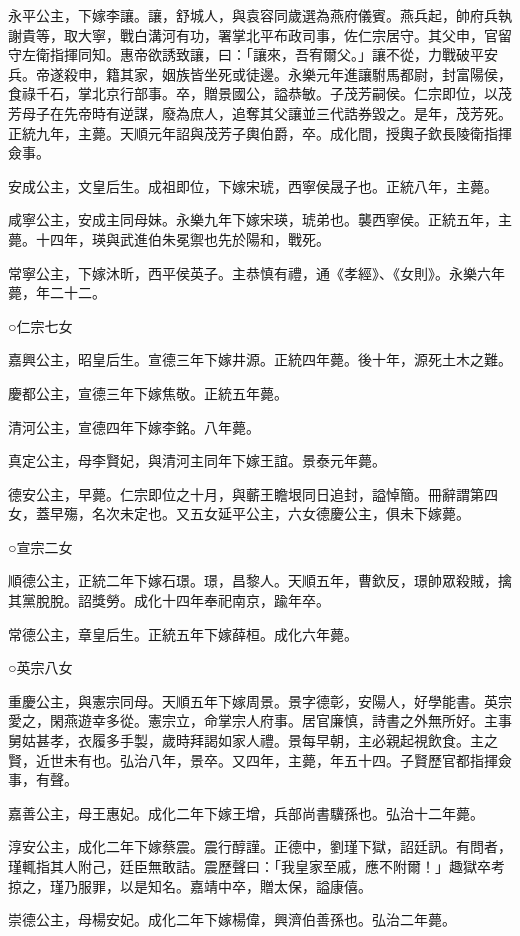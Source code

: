 永平公主，下嫁李讓。讓，舒城人，與袁容同歲選為燕府儀賓。燕兵起，帥府兵執謝貴等，取大寧，戰白溝河有功，署掌北平布政司事，佐仁宗居守。其父申，官留守左衛指揮同知。惠帝欲誘致讓，曰：「讓來，吾宥爾父。」讓不從，力戰破平安兵。帝遂殺申，籍其家，姻族皆坐死或徒邊。永樂元年進讓駙馬都尉，封富陽侯，食祿千石，掌北京行部事。卒，贈景國公，謚恭敏。子茂芳嗣侯。仁宗即位，以茂芳母子在先帝時有逆謀，廢為庶人，追奪其父讓並三代誥券毀之。是年，茂芳死。正統九年，主薨。天順元年詔與茂芳子輿伯爵，卒。成化間，授輿子欽長陵衛指揮僉事。

安成公主，文皇后生。成祖即位，下嫁宋琥，西寧侯晟子也。正統八年，主薨。

咸寧公主，安成主同母妹。永樂九年下嫁宋瑛，琥弟也。襲西寧侯。正統五年，主薨。十四年，瑛與武進伯朱冕禦也先於陽和，戰死。

常寧公主，下嫁沐昕，西平侯英子。主恭慎有禮，通《孝經》、《女則》。永樂六年薨，年二十二。

○仁宗七女

嘉興公主，昭皇后生。宣德三年下嫁井源。正統四年薨。後十年，源死土木之難。

慶都公主，宣德三年下嫁焦敬。正統五年薨。

清河公主，宣德四年下嫁李銘。八年薨。

真定公主，母李賢妃，與清河主同年下嫁王誼。景泰元年薨。

德安公主，早薨。仁宗即位之十月，與蘄王瞻垠同日追封，謚悼簡。冊辭謂第四女，蓋早殤，名次未定也。又五女延平公主，六女德慶公主，俱未下嫁薨。

○宣宗二女

順德公主，正統二年下嫁石璟。璟，昌黎人。天順五年，曹欽反，璟帥眾殺賊，擒其黨脫脫。詔獎勞。成化十四年奉祀南京，踰年卒。

常德公主，章皇后生。正統五年下嫁薛桓。成化六年薨。

○英宗八女

重慶公主，與憲宗同母。天順五年下嫁周景。景字德彰，安陽人，好學能書。英宗愛之，閑燕遊幸多從。憲宗立，命掌宗人府事。居官廉慎，詩書之外無所好。主事舅姑甚孝，衣履多手製，歲時拜謁如家人禮。景每早朝，主必親起視飲食。主之賢，近世未有也。弘治八年，景卒。又四年，主薨，年五十四。子賢歷官都指揮僉事，有聲。

嘉善公主，母王惠妃。成化二年下嫁王增，兵部尚書驥孫也。弘治十二年薨。

淳安公主，成化二年下嫁蔡震。震行醇謹。正德中，劉瑾下獄，詔廷訊。有問者，瑾輒指其人附己，廷臣無敢詰。震歷聲曰：「我皇家至戚，應不附爾！」趣獄卒考掠之，瑾乃服罪，以是知名。嘉靖中卒，贈太保，謚康僖。

崇德公主，母楊安妃。成化二年下嫁楊偉，興濟伯善孫也。弘治二年薨。

